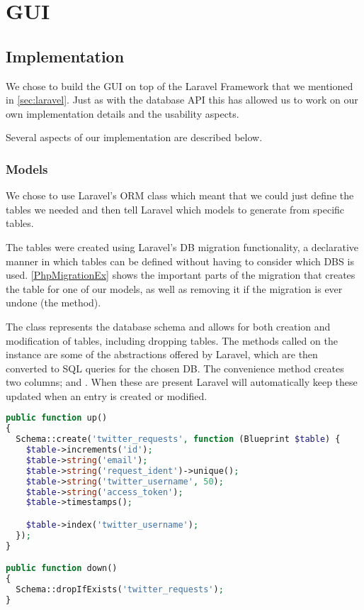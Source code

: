 \chapter{GUI} \label{GUI}

\section{Implementation}
We chose to build the \ac{GUI} on top of the Laravel Framework that we mentioned
in \autoref{sec:laravel}. Just as with the database \ac{API} this has allowed us
to work on our own implementation details and the usability aspects.\nl

Several aspects of our implementation are described below.

\subsection{Models}
We chose to use Laravel's \ac{ORM} class which meant that we could just define
the tables we needed and then tell Laravel which models to generate from
specific tables.\nl

The tables were created using Laravel's \ac{DB} migration functionality, a
declarative manner in which tables can be defined without having to consider
which \ac{DBS} is used. \autoref{PhpMigrationEx} shows the important parts of
the migration that creates the table for one of our models, as well as removing
it if the migration is ever undone (the  method).\nl

The  class represents the database schema and allows for both
creation and modification of tables, including dropping tables. The methods
called on the  instance  are some of the
abstractions offered by Laravel, which are then converted to \ac{SQL} queries for the chosen
\ac{DB}. The convenience method  creates two columns;
 and . When these are present Laravel will
automatically keep these updated when an entry is created or modified.\nl

\begin{minipage}[H]{\linewidth}
\begin{lstlisting}[caption = Example of a migration in Laravel, label =
PhpMigrationEx, language = PHP, style = PHP]
public function up()
{
  Schema::create('twitter_requests', function (Blueprint $table) {
    $table->increments('id');
    $table->string('email');
    $table->string('request_ident')->unique();
    $table->string('twitter_username', 50);
    $table->string('access_token');
    $table->timestamps();

    $table->index('twitter_username');
  });
}

public function down()
{
  Schema::dropIfExists('twitter_requests');
}
\end{lstlisting}
\end{minipage}

